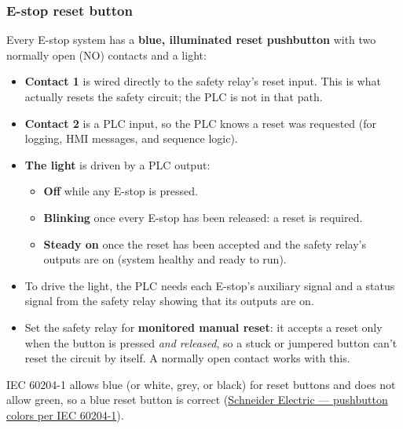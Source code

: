 \subsubsection*{E-stop reset button}
Every E-stop system has a \textbf{blue, illuminated reset pushbutton} with two normally open (NO) contacts and a light:
\begin{itemize}[itemsep=2pt]
  \item \textbf{Contact 1} is wired directly to the safety relay's reset input. This is what actually resets the safety circuit; the PLC is not in that path.
  \item \textbf{Contact 2} is a PLC input, so the PLC knows a reset was requested (for logging, HMI messages, and sequence logic).
  \item \textbf{The light} is driven by a PLC output:
  \begin{itemize}[itemsep=1pt]
    \item \textbf{Off} while any E-stop is pressed.
    \item \textbf{Blinking} once every E-stop has been released: a reset is required.
    \item \textbf{Steady on} once the reset has been accepted and the safety relay's outputs are on (system healthy and ready to run).
  \end{itemize}
  \item To drive the light, the PLC needs each E-stop's auxiliary signal and a status signal from the safety relay showing that its outputs are on.
  \item Set the safety relay for \textbf{monitored manual reset}: it accepts a reset only when the button is pressed \emph{and released}, so a stuck or jumpered button can't reset the circuit by itself. A normally open contact works with this.
\end{itemize}
IEC 60204-1 allows blue (or white, grey, or black) for reset buttons and does not allow green, so a blue reset button is correct (\href{https://www.se.com/uk/en/faqs/FA28043/}{Schneider Electric --- pushbutton colors per IEC 60204-1}).

